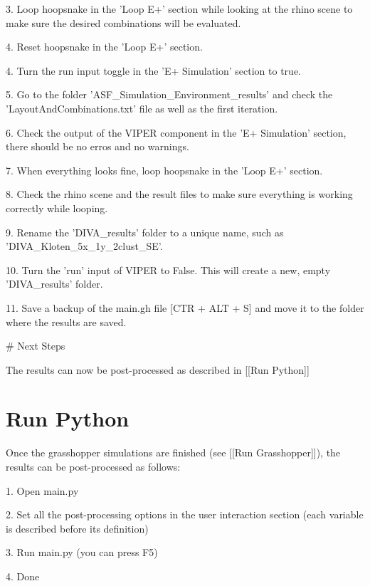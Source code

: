 	3. Loop hoopsnake in the 'Loop E+' section while looking at the rhino scene to make sure the desired combinations will be evaluated. 

	4. Reset hoopsnake in the 'Loop E+' section. 

	4. Turn the run input toggle in the 'E+ Simulation' section to true. 

	5. Go to the folder 'ASF_Simulation\Simulation_Environment\data\grasshopper\DIVA\DIVA_results' and check the 'LayoutAndCombinations.txt' file as well as the first iteration. 

	6. Check the output of the VIPER component in the 'E+ Simulation' section, there should be no erros and no warnings. 

	7. When everything looks fine, loop hoopsnake in the 'Loop E+' section. 

	8. Check the rhino scene and the result files to make sure everything is working correctly while looping. 

	9. Rename the 'DIVA_results' folder to a unique name, such as 'DIVA_Kloten_5x_1y_2clust_SE'. 

	10. Turn the 'run' input of VIPER to False. This will create a new, empty 'DIVA_results' folder. 

	11. Save a backup of the main.gh file [CTR + ALT + S] and move it to the folder where the results are saved. 

	# Next Steps

	The results can now be post-processed as described in [[Run Python]]

\section{Run Python}

	Once the grasshopper simulations are finished (see [[Run Grasshopper]]), the results can be post-processed as follows:

	1. Open main.py

	2. Set all the post-processing options in the user interaction section (each variable is described before its definition)

	3. Run main.py (you can press F5)

	4. Done